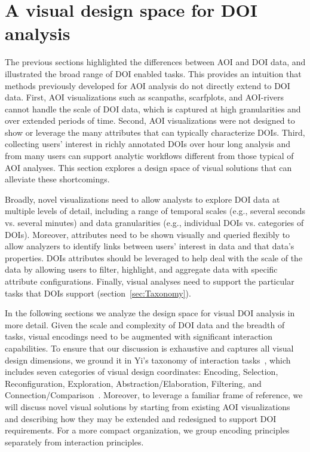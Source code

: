 \section{A visual design space for DOI analysis}
The previous sections highlighted the differences between AOI and DOI data, and illustrated the broad range of DOI enabled tasks. This provides an intuition that methods previously developed for AOI analysis do not directly extend to DOI data. First, AOI visualizations such as scanpaths, scarfplots, and AOI-rivers cannot handle the scale of DOI data, which is captured at high granularities and over extended periods of time. Second, AOI visualizations were not designed to show or leverage the many attributes that can typically characterize DOIs.  Third, collecting users' interest in richly annotated DOIs over hour long analysis and from many users can support analytic workflows different from those typical of AOI analyses. This section explores a design space of visual solutions that can alleviate these shortcomings.

Broadly, novel visualizations need to allow analysts to explore DOI data at multiple levels of detail, including a range of temporal scales (e.g., several seconds vs. several minutes) and data granularities (e.g., individual DOIs vs. categories of DOIs).  Moreover, attributes need to be shown visually and queried flexibly to allow analyzers to identify links between users' interest in data and that data's properties. DOIs attributes should be leveraged to help deal with the scale of the data by allowing users to filter, highlight, and aggregate data with specific attribute configurations. Finally, visual analyses need to support the particular tasks that DOIs support (section~\ref{sec:Taxonomy}). 

In the following sections we analyze the design space for visual DOI analysis in more detail. Given the scale and complexity of DOI data and the breadth of tasks, visual encodings need to be augmented with significant interaction capabilities. To ensure that our discussion is exhaustive and captures all visual design dimensions, we ground it in Yi's taxonomy of interaction tasks~\cite{yi2007toward}, which includes seven categories of visual design coordinates: Encoding, Selection, Reconfiguration, Exploration, Abstraction/Elaboration, Filtering, and Connection/Comparison~\cite{yi2007toward}. Moreover, to leverage a familiar frame of reference, we will discuss novel visual solutions by starting from existing AOI visualizations and describing how they may be extended and redesigned to support DOI requirements. For a more compact organization, we group encoding principles separately from interaction principles.
 

